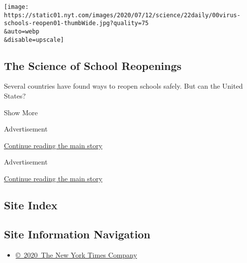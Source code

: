 \begin{enumerate}
  \texttt{[image: https://static01.nyt.com/images/2020/07/12/science/22daily/00virus-schools-reopen01-thumbWide.jpg?quality=75\\\&auto=webp\\\&disable=upscale]}

  \hypertarget{the-science-of-school-reopenings}{%
  \subsection{The Science of School
  Reopenings}\label{the-science-of-school-reopenings}}

  Several countries have found ways to reopen schools safely. But can
  the United States?
\end{enumerate}

Show More

Advertisement

\protect\hyperlink{after-mid5}{Continue reading the main story}

Advertisement

\protect\hyperlink{after-mktg}{Continue reading the main story}

\hypertarget{site-index}{%
\subsection{Site Index}\label{site-index}}

\hypertarget{site-information-navigation}{%
\subsection{Site Information
Navigation}\label{site-information-navigation}}

\begin{itemize}
\tightlist
\item
  \href{https://help.nytimes.com/hc/en-us/articles/115014792127-Copyright-notice}{©~2020~The
  New York Times Company}
\end{itemize}

